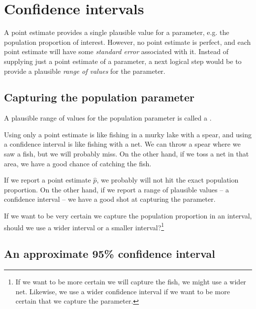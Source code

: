 \section[Confidence intervals]{Confidence intervals} %
\label{confidenceIntervals}


A point estimate provides a single plausible value for
a parameter, e.g. the population proportion of interest.
However, no point estimate is perfect, and
each point estimate will have some \emph{standard error}
associated with it. Instead of supplying just a point
estimate of a parameter, a next logical step would be
to provide a plausible \emph{range of values} for the
parameter.

\subsection{Capturing the population parameter}

A plausible range of values for the population parameter
is called a .

Using only a point estimate is like fishing in a murky
lake with a spear, and using a confidence interval is
like fishing with a net. We can throw a spear where we
saw a fish, but we will probably miss. On the other hand,
if we toss a net in that area, we have a good chance of
catching the fish.

If we report a point estimate $\hat{p}$, we probably
will not hit the exact population proportion. On the
other hand, if we report a range of plausible values
-- a confidence interval -- we have a good shot at
capturing the parameter. 

\begin{exercise}
If we want to be very certain we capture the population
proportion in an interval, should we use a wider interval
or a smaller interval?\footnote{If we want to be more
certain we will capture the fish, we might use a
wider net. Likewise, we use a wider confidence interval
if we want to be more certain that we capture the
parameter.}
\end{exercise}

\subsection{An approximate 95\% confidence interval}

